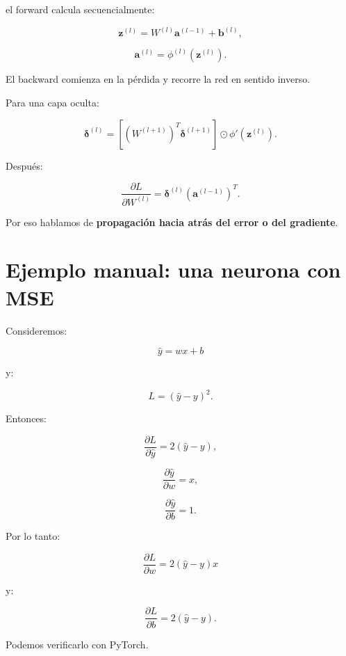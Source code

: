 \documentclass[
  letterpaper,
  DIV=11,
  numbers=noendperiod]{scrartcl}
\begin{document}
el forward calcula secuencialmente:

\[
\mathbf z^{(l)}
=
W^{(l)}\mathbf a^{(l-1)}
+
\mathbf b^{(l)},
\]

\[
\mathbf a^{(l)}
=
\phi^{(l)}(\mathbf z^{(l)}).
\]

El backward comienza en la pérdida y recorre la red en sentido inverso.

Para una capa oculta:

\[
\boxed{
\boldsymbol\delta^{(l)}
=
\left[
(W^{(l+1)})^T
\boldsymbol\delta^{(l+1)}
\right]
\odot
\phi'(\mathbf z^{(l)}).
}
\]

Después:

\[
\frac{\partial L}{\partial W^{(l)}}
=
\boldsymbol\delta^{(l)}
(\mathbf a^{(l-1)})^T.
\]

Por eso hablamos de \textbf{propagación hacia atrás del error o del
gradiente}.

\section{Ejemplo manual: una neurona con
MSE}\label{ejemplo-manual-una-neurona-con-mse}

Consideremos:

\[
\hat y=wx+b
\]

y:

\[
L=(\hat y-y)^2.
\]

Entonces:

\[
\frac{\partial L}{\partial\hat y}
=
2(\hat y-y),
\]

\[
\frac{\partial\hat y}{\partial w}=x,
\]

\[
\frac{\partial\hat y}{\partial b}=1.
\]

Por lo tanto:

\[
\boxed{
\frac{\partial L}{\partial w}
=
2(\hat y-y)x
}
\]

y:

\[
\boxed{
\frac{\partial L}{\partial b}
=
2(\hat y-y).
}
\]

Podemos verificarlo con PyTorch.
\end{document}
